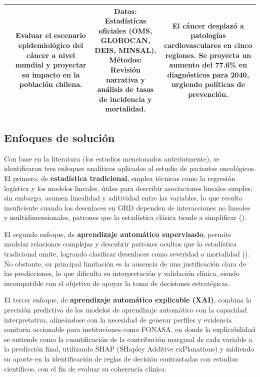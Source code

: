 \begin{table}[htbp]
\begin{tabular}{|c|c|c|c|}
\parbox[t]{1.2cm}{\centering \cite{scielo4}} & 
\parbox[t]{4.0cm}{Evaluar el escenario epidemiológico del cáncer a nivel mundial y proyectar su impacto en la población chilena.} & 
\parbox[t]{5.0cm}{\textbf{Datos:} Estadísticas oficiales (OMS, GLOBOCAN, DEIS, MINSAL). \newline \textbf{Métodos:} Revisión narrativa y análisis de tasas de incidencia y mortalidad.} & 
\parbox[t]{5.0cm}{El cáncer desplazó a patologías cardiovasculares en cinco regiones. Se proyecta un aumento del 77.6\% en diagnósticos para 2040, urgiendo políticas de prevención.} \\ \hline

\end{tabular}
\end{table}


\subsection{Enfoques de solución}

Con base en la literatura (los estudios mencionados anteriormente), se identificaron tres enfoques analíticos aplicados al estudio de pacientes oncológicos. El primero, de \textbf{estadística tradicional}, emplea técnicas como la regresión logística y los modelos lineales, útiles para describir asociaciones lineales simples; sin embargo, asumen linealidad y aditividad entre las variables, lo que resulta insuficiente cuando los desenlaces en GRD dependen de interacciones no lineales y multidimensionales, patrones que la estadística clásica tiende a simplificar (\cite{article5}). 

El segundo enfoque, de \textbf{aprendizaje automático supervisado}, permite modelar relaciones complejas y descubrir patrones ocultos que la estadística tradicional omite, logrando clasificar desenlaces como severidad o mortalidad (\cite{article1}). No obstante, su principal limitación es la ausencia de una justificación clara de las predicciones, lo que dificulta su interpretación y validación clínica, siendo incompatible con el objetivo de apoyar la toma de decisiones estratégicas.

El tercer enfoque, de \textbf{aprendizaje automático explicable (XAI)}, combina la precisión predictiva de los modelos de aprendizaje automático con la capacidad interpretativa, alineándose con la necesidad de generar perfiles y evidencia sanitaria accionable para instituciones como FONASA, en donde la explicabilidad se entiende como la cuantificación de la contribución marginal de cada variable a la predicción final, utilizando SHAP (SHapley Additive exPlanations) y midiendo su aporte en la identificación de reglas de decisión contrastadas con estudios científicos, con el fin de evaluar su coherencia clínica.


